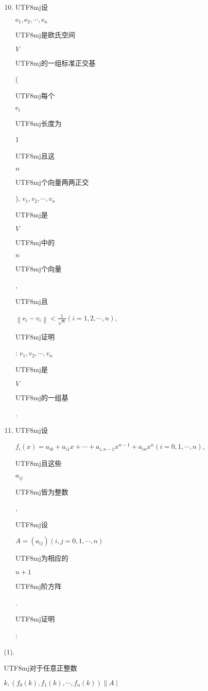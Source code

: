 \documentclass[10pt]{article}
\begin{document}
\begin{enumerate}
  \setcounter{enumi}{9}
  \item \begin{CJK}{UTF8}{mj}设\end{CJK} $\mathrm{e}_{1}, \mathrm{e}_{2}, \cdots, \mathrm{e}_{n}$ \begin{CJK}{UTF8}{mj}是欧氏空间\end{CJK} $V$ \begin{CJK}{UTF8}{mj}的一组标准正交基\end{CJK} (\begin{CJK}{UTF8}{mj}每个\end{CJK} $\mathrm{e}_{i}$ \begin{CJK}{UTF8}{mj}长度为\end{CJK} 1 \begin{CJK}{UTF8}{mj}且这\end{CJK} $n$ \begin{CJK}{UTF8}{mj}个向量两两正交\end{CJK}), $v_{1}, v_{2}, \cdots, v_{n}$ \begin{CJK}{UTF8}{mj}是\end{CJK} $V$ \begin{CJK}{UTF8}{mj}中的\end{CJK} $n$ \begin{CJK}{UTF8}{mj}个向量\end{CJK}, \begin{CJK}{UTF8}{mj}且\end{CJK} $\left\|\mathrm{e}_{i}-v_{i}\right\|<\frac{1}{\sqrt{n}}(i=1,2, \cdots, n)$, \begin{CJK}{UTF8}{mj}证明\end{CJK}: $v_{1}, v_{2}, \cdots, v_{n}$ \begin{CJK}{UTF8}{mj}是\end{CJK} $V$ \begin{CJK}{UTF8}{mj}的一组基\end{CJK}.

  \item \begin{CJK}{UTF8}{mj}设\end{CJK} $f_{i}(x)=a_{i 0}+a_{i 1} x+\cdots+a_{i, n-1} x^{n-1}+a_{i n} x^{n}(i=0,1, \cdots, n)$, \begin{CJK}{UTF8}{mj}且这些\end{CJK} $a_{i j}$ \begin{CJK}{UTF8}{mj}皆为整数\end{CJK}, \begin{CJK}{UTF8}{mj}设\end{CJK} $A=\left(a_{i j}\right)(i, j=0,1, \cdots, n)$ \begin{CJK}{UTF8}{mj}为相应的\end{CJK} $n+1$ \begin{CJK}{UTF8}{mj}阶方阵\end{CJK}. \begin{CJK}{UTF8}{mj}证明\end{CJK}:

\end{enumerate}
(1). \begin{CJK}{UTF8}{mj}对于任意正整数\end{CJK} $k,\left(f_{0}(k), f_{1}(k), \cdots, f_{n}(k)\right) \| A \mid$
\end{document}
